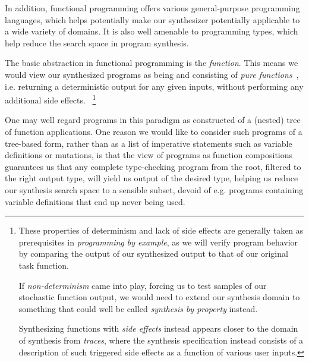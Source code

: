 \documentclass{article}
\begin{document}
In addition, functional programming offers various general-purpose programming languages,
which helps potentially make our synthesizer potentially applicable to a wide variety of domains.
It is also well amenable to programming types,
which help reduce the search space in program synthesis.

The basic abstraction in functional programming is the \emph{function}.
This means we would view our synthesized programs as being and consisting of \emph{pure functions}~\citep{fortran95},
i.e. returning a deterministic output for any given inputs,
without performing any additional side effects.%
~\footnote{
    These properties of determinism and lack of side effects are generally taken as prerequisites in \emph{programming by example},
    as we will verify program behavior by comparing the output of our synthesized output to that of our original task function.

    If \emph{non-determinism} came into play,
    forcing us to test samples of our stochastic function output,
    we would need to extend our synthesis domain to something that could well be called \emph{synthesis by property} instead.

    Synthesizing functions with \emph{side effects} instead appears closer to the domain of synthesis from \emph{traces},
    where the synthesis specification instead consists of a description of such triggered side effects as a function of various user inputs.
}


One may well regard programs in this paradigm as constructed of a (nested) tree of function applications.
One reason we would like to consider such programs of a tree-based form,
rather than as a list of imperative statements such as variable definitions or mutations,
is that the view of programs as function compositions guarantees us that any complete type-checking program from the root,
filtered to the right output type,
will yield us output of the desired type,
helping us reduce our synthesis search space to a sensible subset,
devoid of e.g. programs containing variable definitions that end up never being used.
\end{document}
